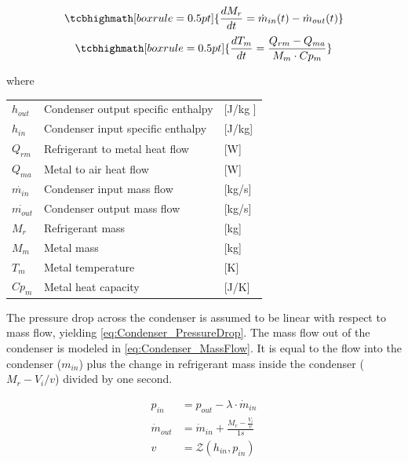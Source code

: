 \begin{equation}
	\tcbhighmath[boxrule = 0.5pt]{ 	\frac{dM_r}{dt} 	 = \dot{m}_{in}(t) - \dot{m}_{out}(t) }     	\label{eq:Condenser_ChangeOfMass}
\end{equation}
\begin{equation}
	\tcbhighmath[boxrule = 0.5pt]{ 	\frac{dT_m}{dt} 	 = \frac{Q_{rm} - Q_{ma}}{M_m \cdot Cp_m}	 }     \label{eq:Condenser_ChangeOfTemperature}
\end{equation}



where

\begin{center}
	\begin{tabular}{l p{8cm} l}
		$h_{out}$       & Condenser output specific enthalpy & [\si{J}/\si{kg} ] \\
		$h_{in}$        & Condenser input specific enthalpy  & [\si{J}/\si{kg}]  \\
		$Q_{rm}$        & Refrigerant to metal heat flow     & [\si{W}]          \\
		$Q_{ma}$        & Metal to air heat flow             & [\si{W}]          \\
		$\dot{m_{in}}$  & Condenser input mass flow          & [\si{kg}/\si{s}]  \\
		$\dot{m_{out}}$ & Condenser output mass flow         & [\si{kg}/\si{s}]  \\
		$M_r$           & Refrigerant mass                   & [\si{kg}]         \\
		$M_m$           & Metal mass                         & [\si{kg}]         \\
		$T_m$           & Metal temperature                  & [\si{K}]          \\
		$Cp_m$          & Metal heat capacity                & [\si{J}/\si{K}]
	\end{tabular}
\end{center}

The pressure drop across the condenser is assumed to be linear with respect to mass flow, yielding \cref{eq:Condenser_PressureDrop}.
The mass flow out of the condenser is modeled in \cref{eq:Condenser_MassFlow}. It is equal to the flow into the condenser ($m_{in}$) plus the change in refrigerant mass inside the condenser ($M_r - V_i/v$) divided by one second.


\begin{align}
	p_{in} 	& =  p_{out} - \lambda \cdot \dot{m}_{in}  				\label{eq:Condenser_PressureDrop}\\
	\dot{m}_{out}		& = \dot{m}_{in} + \frac{M_r - \frac{V_i}{v}}{1s}		\label{eq:Condenser_MassFlow} \\
	v & = \mathcal{Z}(h_{in}, p_{in})
\end{align}

